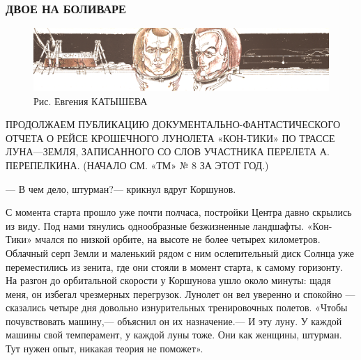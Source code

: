 \documentclass[11pt,a4paper,oneside]{article}
\begin{document}
\subsubsection{ДВОЕ НА БОЛИВАРЕ}
\begin{figure}[H]
\includegraphics[width=\textwidth]{bolivar}
\caption{Рис. Евгения КАТЫШЕВА}
\end{figure}

ПРОДОЛЖАЕМ ПУБЛИКАЦИЮ ДОКУМЕНТАЛЬНО-ФАНТАСТИЧЕСКОГО ОТЧЕТА О РЕЙСЕ КРОШЕЧНОГО ЛУНОЛЕТА «КОН-ТИКИ» ПО ТРАССЕ ЛУНА—ЗЕМЛЯ, ЗАПИСАННОГО СО СЛОВ УЧАСТНИКА ПЕРЕЛЕТА А. ПЕРЕПЕЛКИНА. (НАЧАЛО СМ. «ТМ» № 8 ЗА ЭТОТ ГОД.)

— В чем дело, штурман?— крикнул вдруг Коршунов.

С момента старта прошло уже почти полчаса, постройки Центра давно скрылись из виду. Под нами тянулись однообразные безжизненные ландшафты. «Кон-Тики» мчался по низкой орбите, на высоте не более четырех километров. Облачный серп Земли и маленький рядом с ним ослепительный диск Солнца уже переместились из зенита, где они стояли в момент старта, к самому горизонту. На разгон до орбитальной скорости у Коршунова ушло около минуты: щадя меня, он избегал чрезмерных перегрузок. Лунолет он вел уверенно и спокойно — сказались четыре дня довольно изнурительных тренировочных полетов. «Чтобы почувствовать машину,— объяснил он их назначение.— И эту луну. У каждой машины свой темперамент, у каждой луны тоже. Они как женщины, штурман. Тут нужен опыт, никакая теория не поможет».
\end{document}
